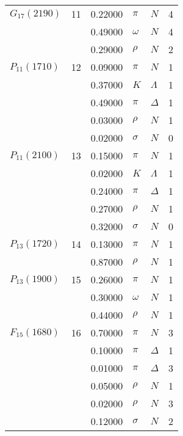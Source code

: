 \documentclass[a4paper,10pt]{article}
\begin{document}
\begin{tabular}[t]{|lr|l|ll|l|}
\hline
$      G_{17}(2190)  $& 11& 0.22000&$ \pi                 $ &$ N                   $& 4\\
$                    $&   & 0.49000&$ \omega              $ &$ N                   $& 4\\
$                    $&   & 0.29000&$ \rho                $ &$ N                   $& 2\\
\hline
$      P_{11}(1710)  $& 12& 0.09000&$ \pi                 $ &$ N                   $& 1\\
$                    $&   & 0.37000&$ K                   $ &$ \Lambda             $& 1\\
$                    $&   & 0.49000&$ \pi                 $ &$ \Delta              $& 1\\
$                    $&   & 0.03000&$ \rho                $ &$ N                   $& 1\\
$                    $&   & 0.02000&$ \sigma              $ &$ N                   $& 0\\
\hline
$      P_{11}(2100)  $& 13& 0.15000&$ \pi                 $ &$ N                   $& 1\\
$                    $&   & 0.02000&$ K                   $ &$ \Lambda             $& 1\\
$                    $&   & 0.24000&$ \pi                 $ &$ \Delta              $& 1\\
$                    $&   & 0.27000&$ \rho                $ &$ N                   $& 1\\
$                    $&   & 0.32000&$ \sigma              $ &$ N                   $& 0\\
\hline
$      P_{13}(1720)  $& 14& 0.13000&$ \pi                 $ &$ N                   $& 1\\
$                    $&   & 0.87000&$ \rho                $ &$ N                   $& 1\\
\hline
$      P_{13}(1900)  $& 15& 0.26000&$ \pi                 $ &$ N                   $& 1\\
$                    $&   & 0.30000&$ \omega              $ &$ N                   $& 1\\
$                    $&   & 0.44000&$ \rho                $ &$ N                   $& 1\\
\hline
$      F_{15}(1680)  $& 16& 0.70000&$ \pi                 $ &$ N                   $& 3\\
$                    $&   & 0.10000&$ \pi                 $ &$ \Delta              $& 1\\
$                    $&   & 0.01000&$ \pi                 $ &$ \Delta              $& 3\\
$                    $&   & 0.05000&$ \rho                $ &$ N                   $& 1\\
$                    $&   & 0.02000&$ \rho                $ &$ N                   $& 3\\
$                    $&   & 0.12000&$ \sigma              $ &$ N                   $& 2\\
\hline
\end{tabular}
\end{document}

